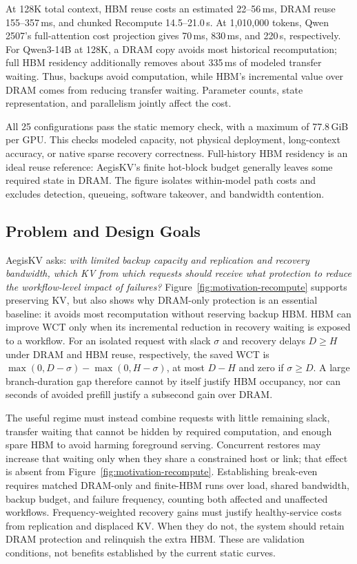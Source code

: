 At 128K total context, HBM reuse costs an estimated 22--56\,ms,
DRAM reuse 155--357\,ms, and chunked Recompute 14.5--21.0\,s.
At 1,010,000 tokens, Qwen 2507's full-attention cost projection gives
70\,ms, 830\,ms, and 220\,s, respectively. For Qwen3-14B at 128K,
a DRAM copy avoids most historical recomputation; full HBM residency
additionally removes about 335\,ms of modeled transfer waiting.
Thus, backups avoid computation, while HBM's incremental value over
DRAM comes from reducing transfer waiting. Parameter counts, state
representation, and parallelism jointly affect the cost.

All 25 configurations pass the static memory check, with a maximum of
77.8\,GiB per GPU. This checks modeled capacity, not physical deployment,
long-context accuracy, or native sparse recovery correctness.
Full-history HBM residency is an ideal reuse reference: AegisKV's finite
hot-block budget generally leaves some required state in DRAM.
The figure isolates within-model path costs and excludes detection,
queueing, software takeover, and bandwidth contention.

\subsection{Problem and Design Goals}
\label{sec:motivation-goals}

AegisKV asks: \emph{with limited backup capacity and replication and
recovery bandwidth, which KV from which requests should receive what
protection to reduce the workflow-level impact of failures?}
Figure~\ref{fig:motivation-recompute} supports preserving KV, but also
shows why DRAM-only protection is an essential baseline: it avoids most
recomputation without reserving backup HBM. HBM can improve WCT only when
its incremental reduction in recovery waiting is exposed to a workflow.
For an isolated request with slack $\sigma$ and recovery delays
$D\geq H$ under DRAM and HBM reuse, respectively, the saved WCT is
$\max(0,D-\sigma)-\max(0,H-\sigma)$, at most $D-H$ and zero if
$\sigma\geq D$. A large branch-duration gap therefore cannot by itself
justify HBM occupancy, nor can seconds of avoided prefill justify a
subsecond gain over DRAM.

The useful regime must instead combine requests with little remaining
slack, transfer waiting that cannot be hidden by required computation,
and enough spare HBM to avoid harming foreground serving. Concurrent
restores may increase that waiting only when they share a constrained
host or link; that effect is absent from Figure~\ref{fig:motivation-recompute}.
Establishing break-even requires matched DRAM-only and finite-HBM runs
over load, shared bandwidth, backup budget, and failure frequency, counting
both affected and unaffected workflows. Frequency-weighted recovery gains
must justify healthy-service costs from replication and displaced KV.
When they do not, the system should retain DRAM protection and relinquish
the extra HBM. These are validation conditions, not benefits established
by the current static curves.


